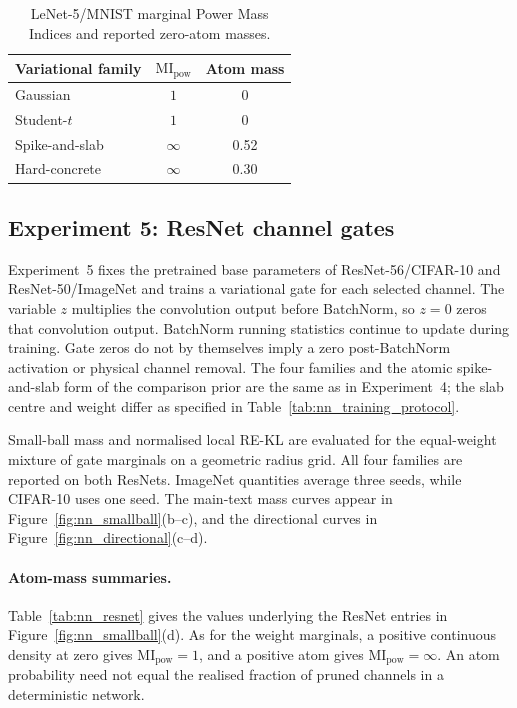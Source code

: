 \documentclass[11pt,a4paper]{article}
\newcommand{\MI}{\mathrm{MI}}
\theoremstyle{compactplain}
\theoremstyle{compactdefinition}
\numberwithin{equation}{section}
\begin{document}
\begin{table}[htbp]
\centering
\caption{LeNet-5/MNIST marginal Power Mass Indices and reported zero-atom masses.}
\label{tab:nn_mi}
\begin{tabular}{lcc}
\toprule
Variational family & \(\MI_{\mathrm{pow}}\) & Atom mass \\
\midrule
Gaussian & \(1\) & 0 \\
Student-\(t\) & \(1\) & 0 \\
Spike-and-slab & \(\infty\) & 0.52 \\
Hard-concrete & \(\infty\) & 0.30 \\
\bottomrule
\end{tabular}
\end{table}

\subsection{Experiment 5: ResNet channel gates}
\label{app:nn_experiment}

Experiment~5 fixes the pretrained base parameters of ResNet-56/CIFAR-10
and ResNet-50/ImageNet and trains a variational gate for each selected
channel. The variable \(z\) multiplies the convolution output before
BatchNorm, so \(z=0\) zeros that convolution output. BatchNorm running
statistics continue to update during training. Gate zeros do not by
themselves imply a zero post-BatchNorm activation or physical channel
removal. The four families and the atomic spike-and-slab form of the
comparison prior are the same as in Experiment~4; the slab centre and
weight differ as specified in Table~\ref{tab:nn_training_protocol}.

Small-ball mass and normalised local RE-KL are evaluated for the
equal-weight mixture of gate marginals on a geometric radius grid.
All four families are reported
on both ResNets. ImageNet quantities average three seeds, while CIFAR-10
uses one seed. The main-text mass curves appear in
Figure~\ref{fig:nn_smallball}(b--c), and the directional curves in
Figure~\ref{fig:nn_directional}(c--d).

\paragraph{Atom-mass summaries.}
Table~\ref{tab:nn_resnet} gives the values underlying the ResNet entries
in Figure~\ref{fig:nn_smallball}(d). As for the weight marginals, a
positive continuous density at zero gives \(\MI_{\mathrm{pow}}=1\),
and a positive atom gives \(\MI_{\mathrm{pow}}=\infty\).
An atom probability need not equal the realised fraction of pruned
channels in a deterministic network.
\end{document}
